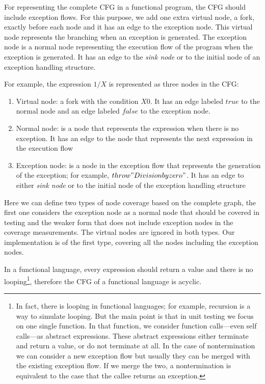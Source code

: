 \documentclass[12pt,a4paper]{report}
\begin{document}
For representing the complete CFG in a functional program, the CFG should include exception flows. For this purpose, we add one extra virtual node, a fork, exactly before each node and it has an edge to the exception node. This virtual node represents the branching when an exception is generated. The exception node is a normal node representing the execution flow of the program when the exception is generated. It has an edge to the \emph{sink node} or to the initial node of an exception handling structure. 

For example, the expression $1/X$ is represented as three nodes in the CFG:
\begin{enumerate}
 \item Virtual node: a fork with the condition $X$\neq$0$. It has an edge labeled $true$ to the normal node and an edge labeled $false$ to the exception node.
 \item Normal node: is a node that represents the expression when there is no exception. It has an edge to the node that represents the next expression in the execution flow
 \item Exception node: is a node in the exception flow that represents the generation of the exception; for example, $throw "Division by zero"$. It has an edge to either \emph{sink node} or to the initial node of the exception handling structure
\end{enumerate}

Here we can define two types of node coverage based on the complete graph, the first one considers the exception node as a normal node that should be covered in testing and the weaker form that does not include exception nodes in the coverage measurements. The virtual nodes are ignored in both types. Our implementation is of the first type, covering all the nodes including the exception nodes.

In a functional language, every expression should return a value and there is no looping\footnote{In fact, there is looping in functional languages; for example, recursion is a way to simulate looping. But the main point is that in unit testing we focus on one single function. In that function, we consider function calls---even self calls---as abstract expressions. These abstract expressions either terminate and return a value, or do not terminate at all. In the case of nontermination we can consider a new exception flow but usually they can be merged with the existing exception flow. If we merge the two, a nontermination is equivalent to the case that the callee returns an exception.}, therefore the CFG of a functional language is acyclic.
\end{document}
